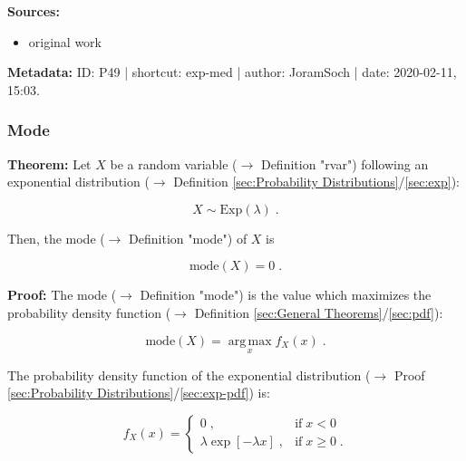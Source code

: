 \documentclass[a4paper,12pt]{book}
\begin{document}
\vspace{1em}
\textbf{Sources:}
\begin{itemize}
\item original work\end{itemize}


\vspace{1em}
\textbf{Metadata:} ID: P49 | shortcut: exp-med | author: JoramSoch | date: 2020-02-11, 15:03.


\subsubsection[\textbf{Mode}]{Mode} \label{sec:exp-mode}

\vspace{1em}
\textbf{Theorem:} Let $X$ be a random variable ($\rightarrow$ Definition "rvar") following an exponential distribution ($\rightarrow$ Definition \ref{sec:Probability Distributions}/\ref{sec:exp}):

\begin{equation} \label{eq:exp-mode-exp}
X \sim \mathrm{Exp}(\lambda) \; .
\end{equation}

Then, the mode ($\rightarrow$ Definition "mode") of $X$ is

\begin{equation} \label{eq:exp-mode-exp-mode}
\mathrm{mode}(X) = 0 \; .
\end{equation}


\vspace{1em}
\textbf{Proof:}  The mode ($\rightarrow$ Definition "mode") is the value which maximizes the probability density function ($\rightarrow$ Definition \ref{sec:General Theorems}/\ref{sec:pdf}):

\begin{equation} \label{eq:exp-mode-mode}
\mathrm{mode}(X) = \operatorname*{arg\,max}_x f_X(x) \; .
\end{equation}

The probability density function of the exponential distribution ($\rightarrow$ Proof \ref{sec:Probability Distributions}/\ref{sec:exp-pdf}) is:

\begin{equation} \label{eq:exp-mode-exp-pdf}
f_X(x) = \left\{
\begin{array}{rl}
0 \; , & \text{if} \; x < 0 \\
\lambda \exp[-\lambda x] \; , & \text{if} \; x \geq 0 \; .
\end{array}
\right.
\end{equation}
\end{document}
